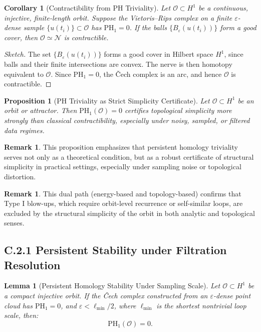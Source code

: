 \documentclass[11pt]{article}
\newtheorem{lemma}[theorem]{Lemma}
\newtheorem{proposition}[theorem]{Proposition}
\newtheorem{corollary}[theorem]{Corollary}
\theoremstyle{definition}
\newtheorem{remark}[theorem]{Remark}
\begin{document}
\begin{corollary}[Contractibility from PH Triviality]
Let \( \mathcal{O} \subset H^1 \) be a continuous, injective, finite-length orbit. Suppose the Vietoris–Rips complex on a finite \( \varepsilon \)-dense sample \( \{ u(t_i) \} \subset \mathcal{O} \) has \( \mathrm{PH}_1 = 0 \). If the balls \( \{ B_\varepsilon(u(t_i)) \} \) form a good cover, then \( \mathcal{O} \simeq \mathcal{N} \) is contractible.
\end{corollary}

\begin{proof}[Sketch]
The set \( \{ B_\varepsilon(u(t_i)) \} \) forms a good cover in Hilbert space \( H^1 \), since balls and their finite intersections are convex. The nerve is then homotopy equivalent to \( \mathcal{O} \). Since \( \mathrm{PH}_1 = 0 \), the Čech complex is an arc, and hence \( \mathcal{O} \) is contractible.
\end{proof}

\begin{proposition}[PH Triviality as Strict Simplicity Certificate]
Let \( \mathcal{O} \subset H^1 \) be an orbit or attractor. Then $\mathrm{PH}_1(\mathcal{O}) = 0$ certifies topological simplicity more strongly than classical contractibility, especially under noisy, sampled, or filtered data regimes.
\end{proposition}

\begin{remark}
This proposition emphasizes that persistent homology triviality serves not only as a theoretical condition, but as a robust certificate of structural simplicity in practical settings, especially under sampling noise or topological distortion.
\end{remark}

\begin{remark}
This dual path (energy-based and topology-based) confirms that Type I blow-ups, which require orbit-level recurrence or self-similar loops, are excluded by the structural simplicity of the orbit in both analytic and topological senses.
\end{remark}

\subsection*{C.2.1 Persistent Stability under Filtration Resolution}

\begin{lemma}[Persistent Homology Stability Under Sampling Scale]
Let \( \mathcal{O} \subset H^1 \) be a compact injective orbit. If the Čech complex constructed from an \( \varepsilon \)-dense point cloud has \( \mathrm{PH}_1 = 0 \), and \( \varepsilon < \ell_{\min}/2 \), where \( \ell_{\min} \) is the shortest nontrivial loop scale, then:
\[
\mathrm{PH}_1(\mathcal{O}) = 0.
\]
\end{lemma}
\end{document}
